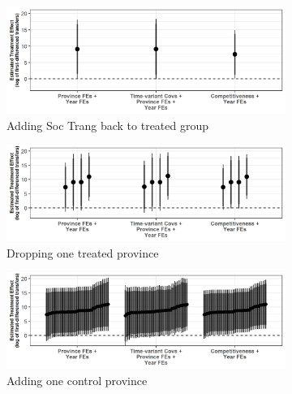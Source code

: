 \documentclass[12pt]{article}
\newcommand{\1}{\mathbbm{1}}
\begin{document}
\begin{figure}[!htbp]
	\centering
	\begin{subfigure}{.8\textwidth}
		\centering
		\includegraphics[width=\textwidth]{figure/210202_perturb_results_treat_add.png}
		\captionsetup{singlelinecheck=off, justification=centering}
		\caption{Adding Soc Trang back to treated group}
	\end{subfigure}
	\begin{subfigure}{.8\textwidth}
		\centering
		\includegraphics[width=\textwidth]{figure/210202_perturb_results_treat_drop.png}
		\captionsetup{singlelinecheck=off, justification=centering}
		\caption{Dropping one treated province}
	\end{subfigure}
	\begin{subfigure}{.8\textwidth}
		\centering
		\includegraphics[width=\textwidth]{figure/210202_perturb_results_control_add.png}
		\captionsetup{singlelinecheck=off, justification=centering}
		\caption{Adding one control province}
	\end{subfigure}
	\begin{subfigure}{.8\textwidth}

\end{subfigure}
\end{figure}
\end{document}
